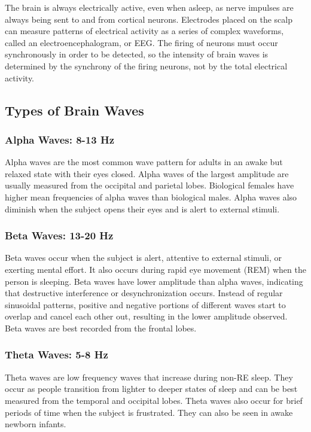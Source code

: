 \documentclass{article}
\begin{document}
The brain is always electrically active, even when asleep, as nerve impulses are always being sent to and from cortical neurons. Electrodes placed on the scalp can measure patterns of electrical activity as a series of complex waveforms, called an electroencephalogram, or EEG. The firing of neurons must occur synchronously in order to be detected, so the intensity of brain waves is determined by the synchrony of the firing neurons, not by the total electrical activity.

\subsection*{Types of Brain Waves}
\subsubsection*{Alpha Waves: 8-13 Hz}
Alpha waves are the most common wave pattern for adults in an awake but relaxed state with their eyes closed. Alpha waves of the largest amplitude are usually measured from the occipital and parietal lobes. Biological females have higher mean frequencies of alpha waves than biological males. Alpha waves also diminish when the subject opens their eyes and is alert to external stimuli.

\subsubsection*{Beta Waves: 13-20 Hz}
Beta waves occur when the subject is alert, attentive to external stimuli, or exerting mental effort. It also occurs during rapid eye movement (REM) when the person is sleeping. Beta waves have lower amplitude than alpha waves, indicating that destructive interference or desynchronization occurs. Instead of regular sinusoidal patterns, positive and negative portions of different waves start to overlap and cancel each other out, resulting in the lower amplitude observed. Beta waves are best recorded from the frontal lobes.

\subsubsection*{Theta Waves: 5-8 Hz}
Theta waves are low frequency waves that increase during non-RE sleep. They occur as people transition from lighter to deeper states of sleep and can be best measured from the temporal and occipital lobes. Theta waves also occur for brief periods of time when the subject is frustrated. They can also be seen in awake newborn infants.
\end{document}
